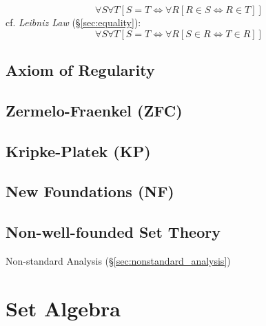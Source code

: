 \[
  \forall S \forall T
    [S = T \Leftrightarrow \forall R [ R \in S \Leftrightarrow R \in T ]]
\]
cf. \emph{Leibniz Law} (\S\ref{sec:equality}):
\[
  \forall S \forall T
    [S = T \Leftrightarrow \forall R [ S \in R \Leftrightarrow T \in R ]]
\]

\subsection{Axiom of Regularity}\label{sec:regularity_axiom}

\subsection{Zermelo-Fraenkel (ZFC)}\label{sec:zermelo_fraenkel}


\subsection{Kripke-Platek (KP)}\label{sec:kripke_platek}

\subsection{New Foundations (NF)}\label{sec:quine_foundations}

\subsection{Non-well-founded Set Theory}\label{sec:non_wellfounded}

Non-standard Analysis (\S\ref{sec:nonstandard_analysis})



\section{Set Algebra}\label{sec:set_algebra}


